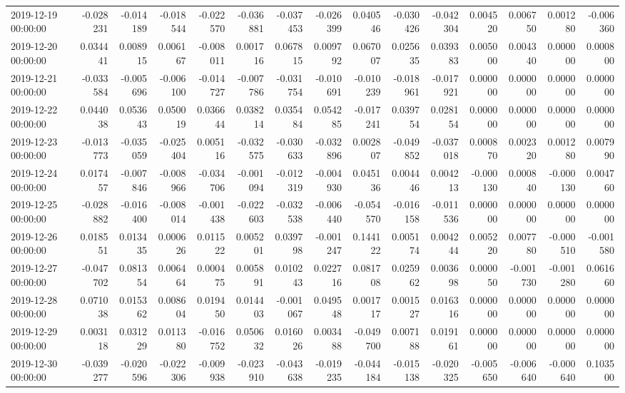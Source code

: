 \begin{tabular}{lrrrrrrrrrrrrrr}
2019-12-19 00:00:00 & -0.028231 & -0.014189 & -0.018544 & -0.022570 & -0.036881 & -0.037453 & -0.026399 & 0.040546 & -0.030426 & -0.042304 & 0.004520 & 0.006750 & 0.001280 & -0.006360 \\
2019-12-20 00:00:00 & 0.034441 & 0.008915 & 0.006167 & -0.008011 & 0.001716 & 0.067815 & 0.009792 & 0.067007 & 0.025635 & 0.039383 & 0.005000 & 0.004340 & 0.000000 & 0.000800 \\
2019-12-21 00:00:00 & -0.033584 & -0.005696 & -0.006100 & -0.014727 & -0.007786 & -0.031754 & -0.010691 & -0.010239 & -0.018961 & -0.017921 & 0.000000 & 0.000000 & 0.000000 & 0.000000 \\
2019-12-22 00:00:00 & 0.044038 & 0.053643 & 0.050019 & 0.036644 & 0.038214 & 0.035484 & 0.054285 & -0.017241 & 0.039754 & 0.028154 & 0.000000 & 0.000000 & 0.000000 & 0.000000 \\
2019-12-23 00:00:00 & -0.013773 & -0.035059 & -0.025404 & 0.005116 & -0.032575 & -0.030633 & -0.032896 & 0.002807 & -0.049852 & -0.037018 & 0.000870 & 0.002320 & 0.001280 & 0.007990 \\
2019-12-24 00:00:00 & 0.017457 & -0.007846 & -0.008966 & -0.034706 & -0.001094 & -0.012319 & -0.004930 & 0.045136 & 0.004446 & 0.004213 & -0.000130 & 0.000840 & -0.000130 & 0.004760 \\
2019-12-25 00:00:00 & -0.028882 & -0.016400 & -0.008014 & -0.001438 & -0.022603 & -0.032538 & -0.006440 & -0.054570 & -0.016158 & -0.011536 & 0.000000 & 0.000000 & 0.000000 & 0.000000 \\
2019-12-26 00:00:00 & 0.018551 & 0.013435 & 0.000626 & 0.011522 & 0.005201 & 0.039798 & -0.001247 & 0.144122 & 0.005174 & 0.004244 & 0.005220 & 0.007780 & -0.000510 & -0.001580 \\
2019-12-27 00:00:00 & -0.047702 & 0.081354 & 0.006464 & 0.000475 & 0.005891 & 0.010243 & 0.022716 & 0.081708 & 0.025962 & 0.003698 & 0.000050 & -0.001730 & -0.001280 & 0.061660 \\
2019-12-28 00:00:00 & 0.071038 & 0.015362 & 0.008604 & 0.019450 & 0.014403 & -0.001067 & 0.049548 & 0.001717 & 0.001527 & 0.016316 & 0.000000 & 0.000000 & 0.000000 & 0.000000 \\
2019-12-29 00:00:00 & 0.003118 & 0.031229 & 0.011380 & -0.016752 & 0.050632 & 0.016026 & 0.003488 & -0.049700 & 0.007188 & 0.019161 & 0.000000 & 0.000000 & 0.000000 & 0.000000 \\
2019-12-30 00:00:00 & -0.039277 & -0.020596 & -0.022306 & -0.009938 & -0.023910 & -0.043638 & -0.019235 & -0.044184 & -0.015138 & -0.020325 & -0.005650 & -0.006640 & -0.000640 & 0.103500 \\

\end{tabular}
